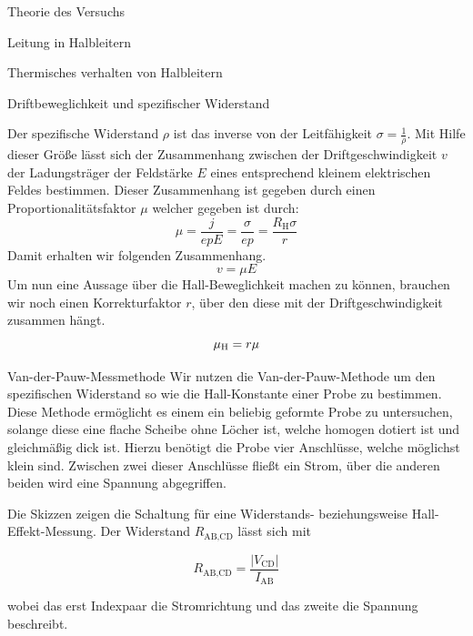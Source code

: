 \documentclass[pdftex, a4paper,11pt, twoside, ngerman]{report}
\newcommand\abs[1]{\left| #1 \right|}
\begin{document}
\begin{chapter}{Theorie des Versuchs}
\begin{section}{Leitung in Halbleitern}
\begin{subsection}{Thermisches verhalten von Halbleitern}
        \end{subsection}

        \begin{subsection}{Driftbeweglichkeit und spezifischer Widerstand}

            Der spezifische Widerstand $\rho$ ist das inverse von der Leitfähigkeit $\sigma = \frac 1\rho$.
            Mit Hilfe dieser Größe lässt sich der Zusammenhang zwischen der Driftgeschwindigkeit $v$ der Ladungsträger der Feldstärke $E$ eines entsprechend kleinem elektrischen Feldes bestimmen.
            Dieser Zusammenhang ist gegeben durch einen Proportionalitätsfaktor $\mu$ welcher gegeben ist durch:
            \[
                \mu = \frac j{epE} = \frac \sigma{ep} = \frac{R_\text{H} \sigma}r
            \]
            Damit erhalten wir folgenden Zusammenhang.
            \[
                v = \mu E
            \]
            Um nun eine Aussage über die Hall-Beweglichkeit machen zu können, brauchen wir noch einen Korrekturfaktor $r$, über den diese mit der Driftgeschwindigkeit zusammen hängt.
            \[
                \mu_\text H =r\mu
            \]

        \end{subsection}

        \begin{subsection}{Van-der-Pauw-Messmethode}
            Wir nutzen die Van-der-Pauw-Methode um den spezifischen Widerstand so wie die Hall-Konstante einer Probe zu bestimmen.
            Diese Methode ermöglicht es einem ein beliebig geformte Probe zu untersuchen, solange diese eine flache Scheibe ohne Löcher ist, welche homogen dotiert ist und gleichmäßig dick ist.
            Hierzu benötigt die Probe vier Anschlüsse, welche möglichst klein sind. 
            Zwischen zwei dieser Anschlüsse fließt ein Strom, über die anderen beiden wird eine Spannung abgegriffen.
            

            Die Skizzen zeigen die Schaltung für eine Widerstands- beziehungsweise Hall-Effekt-Messung.
            Der Widerstand $R_\text{AB,CD}$ lässt sich mit 
            
            \[
                R_\text{AB,CD} = \frac{\abs{V_\text{CD}}}{I_\text{AB}}
            \]
            
            wobei das erst Indexpaar die Stromrichtung und das zweite die Spannung beschreibt. 

        \end{subsection}


\end{section}
\end{chapter}
\end{document}
